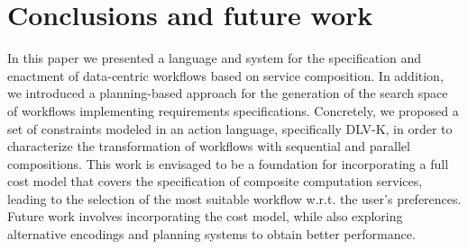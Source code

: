 
\section{Conclusions and future work} \label{sec:conclusions}

In this paper we presented a language and system for the specification and enactment of data-centric workflows based on service composition. In addition, we introduced a planning-based approach for the generation of the search space of workflows implementing requirements specifications. Concretely, we proposed a set of constraints modeled in an action language, specifically DLV-K, in order to characterize the transformation of workflows with sequential and parallel compositions. This work is envisaged to be a foundation for incorporating a full cost model that covers the specification of composite computation services, leading to the selection of the most suitable workflow w.r.t. the user's preferences. Future work involves incorporating the cost model, while also exploring alternative encodings and planning systems to obtain better performance.
